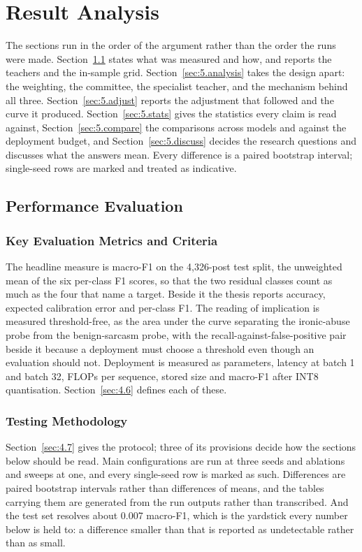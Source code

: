 \chapter{Result Analysis}
\label{ch:5}
The sections run in the order of the argument rather than the order the runs were made.
Section~\ref{sec:5.perf} states what was measured and how, and reports the teachers and the
in-sample grid. Section~\ref{sec:5.analysis} takes the design apart: the weighting, the committee,
the specialist teacher, and the mechanism behind all three. Section~\ref{sec:5.adjust} reports the
adjustment that followed and the curve it produced. Section~\ref{sec:5.stats} gives the statistics
every claim is read against, Section~\ref{sec:5.compare} the comparisons across models and against
the deployment budget, and Section~\ref{sec:5.discuss} decides the research questions and discusses
what the answers mean. Every difference is a paired bootstrap interval; single-seed rows are marked
and treated as indicative.
\section{Performance Evaluation}
\label{sec:5.perf}
\subsection{Key Evaluation Metrics and Criteria}
\label{sec:5.metrics}
The headline measure is macro-F1 on the 4,326-post test split, the unweighted mean of the six
per-class F1 scores, so that the two residual classes count as much as the four that name a target.
Beside it the thesis reports accuracy, expected calibration error and per-class F1. The reading of
implication is measured threshold-free, as the area under the curve separating the ironic-abuse
probe from the benign-sarcasm probe, with the recall-against-false-positive pair beside it because a
deployment must choose a threshold even though an evaluation should not. Deployment is measured as
parameters, latency at batch 1 and batch 32, FLOPs per sequence, stored size and macro-F1 after INT8
quantisation. Section~\ref{sec:4.6} defines each of these.
\subsection{Testing Methodology}
\label{sec:5.testing}
Section~\ref{sec:4.7} gives the protocol; three of its provisions decide how the sections below
should be read. Main configurations are run at three seeds and ablations and sweeps at one, and
every single-seed row is marked as such. Differences are paired bootstrap intervals rather than
differences of means, and the tables carrying them are generated from the run outputs rather than
transcribed. And the test set resolves about 0.007 macro-F1, which is the yardstick every number
below is held to: a difference smaller than that is reported as undetectable rather than as small.
